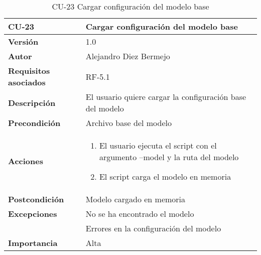 \begin{table}[p]
	\centering
	\begin{tabularx}{\linewidth}{ p{} p{} }
		\toprule
		\textbf{CU-23}    & \textbf{Cargar configuración del modelo base}\\
		\toprule
		\textbf{Versión}              & 1.0    \\
		\textbf{Autor}                & Alejandro Diez Bermejo \\
		\textbf{Requisitos asociados} & RF-5.1 \\
		\textbf{Descripción}          & El usuario quiere cargar la configuración base del modelo \\
        \textbf{Precondición}         & Archivo base del modelo \\
		\textbf{Acciones}             &
		\begin{enumerate}
			\def\labelenumi{\arabic{enumi}.}
			\tightlist
            \item El usuario ejecuta el script con el argumento --model y la ruta del modelo
            \item El script carga el modelo en memoria
		\end{enumerate}\\
		\textbf{Postcondición}        & Modelo cargado en memoria \\
		\textbf{Excepciones}          & No se ha encontrado el modelo \\
                                      & Errores en la configuración del modelo \\
		\textbf{Importancia}          & Alta \\
		\bottomrule
	\end{tabularx}
	\caption{CU-23 Cargar configuración del modelo base}
\end{table}

